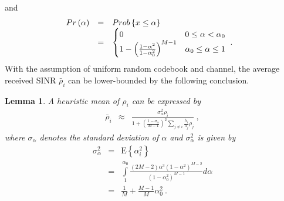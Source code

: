 \documentclass[10pt,fleqn, twocolumn]{IEEEtran}
\newtheorem{lemma}{Lemma}
\begin{document}
\noindent and
\begin{equation}\hspace{-0.10in}
\begin{array}{rcl}
\mbox{Pr}\left(\alpha\right)&=&\mbox{Prob}\left\{x\leq\alpha\right\} \\
&=&
\begin{cases}
0 & 0 \leq\alpha < \alpha_{0} \\
1-\left(\frac{1-\alpha^2}{1-\alpha_{0}^2}\right)^{M-1} &
\alpha_{0}\leq\alpha\leq 1
\end{cases}\ .
\end{array}
\end{equation}
\noindent With the assumption of uniform random codebook and
channel, the average received SINR $\bar\rho_{i}$ can be
lower-bounded by the following conclusion.
\begin{lemma} A heuristic mean of $\rho_{i}$
can be expressed by
\begin{equation}%
\begin{array}{rcl}
\bar\rho_{i}&\approx&\frac{\sigma_{\alpha}^{2}\rho_{i}}{1+
\left(\frac{1-\sigma_{\alpha}}{M-1}\right)^{2}\sum\limits_{j\neq
i}\frac{\lambda_{i}}{\lambda_{j}}\rho_{j}}\ ,
\end{array}
\end{equation}
\noindent where  $\sigma_{\alpha}$ denotes the standard deviation
of $\alpha$ and $\sigma_{\alpha}^2$ is given by
\begin{equation}
\begin{array}{rcl}
\sigma_{\alpha}^2&=&\mbox{E}\left\{\alpha_{i}^2\right\}\\
&=&\int\limits_{1}^{\alpha_{0}}\frac{\left(2M-2\right)\alpha^3\left(1-\alpha^2\right)^{M-2}}{\left(1-\alpha_{0}^{2}\right)^{M-1}}d\alpha\\
&=&\frac{1}{M}+\frac{M-1}{M}\alpha_{0}^2\ .
\end{array}
\end{equation}
\end{lemma}
\end{document}
